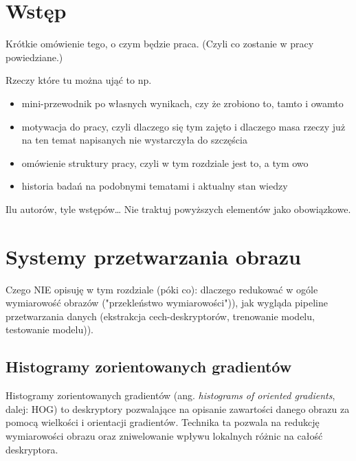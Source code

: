 \documentclass[12pt,a4paper,leqno,oneside,titlepage]{book}
\begin{document}
\mainmatter

\chapter*{Wstęp}

Krótkie omówienie tego, o czym będzie praca. (Czyli co zostanie w pracy powiedziane.)

Rzeczy które tu można ująć to np. 
\begin{itemize}
\item mini-przewodnik po własnych wynikach, czy że zrobiono to, tamto i owamto
\item motywacja do pracy, czyli dlaczego się tym zajęto i dlaczego masa rzeczy już na ten temat napisanych nie wystarczyła do szczęścia
\item omówienie struktury pracy, czyli w tym rozdziale jest to, a tym owo
\item historia badań na podobnymi tematami i aktualny stan wiedzy
\end{itemize}

Ilu autorów, tyle wstępów\ldots{} Nie traktuj powyższych elementów jako obowiązkowe.

\chapter{Systemy przetwarzania obrazu}%

Czego NIE opisuję w tym rozdziale (póki co): dlaczego redukować w ogóle wymiarowość obrazów ("przekleństwo wymiarowości")), jak wygląda pipeline przetwarzania danych (ekstrakcja cech-deskryptorów, trenowanie modelu, testowanie modelu)).

%
%
%
%
%
%
%
%
%
%
%
%
%
%
%
%
%
%
\section{Histogramy zorientowanych gradientów}

Histogramy zorientowanych gradientów (ang. \textit{histograms of oriented gradients}, dalej: HOG) to deskryptory pozwalające na opisanie zawartości danego obrazu za pomocą wielkości i orientacji gradientów. Technika ta pozwala na redukcję wymiarowości obrazu oraz zniwelowanie wpływu lokalnych różnic na całość deskryptora\cite{DalalTriggs05Hog}.
\end{document}
